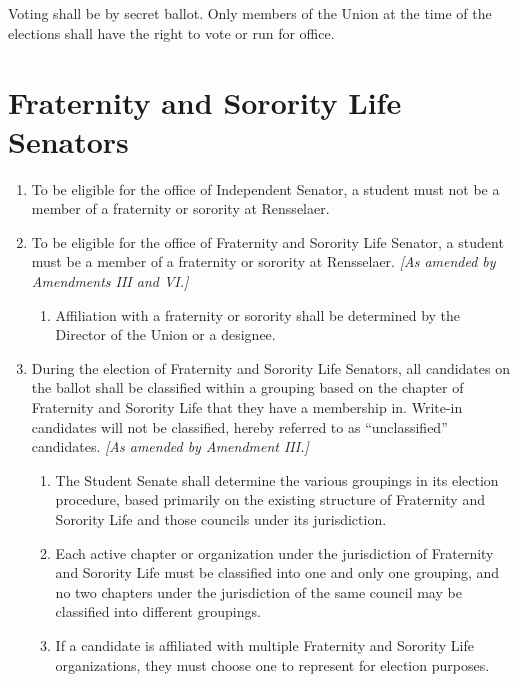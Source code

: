 \documentclass{uniondoc}
\begin{document}
\section{}

Voting shall be by secret ballot. Only members of the Union at the time of the elections shall have the right to vote or run for office.

\section{Fraternity and Sorority Life Senators}

\begin{enumerate}
\item To be eligible for the office of Independent Senator, a student must not be a member of a fraternity or sorority at Rensselaer.
\item To be eligible for the office of Fraternity and Sorority Life Senator, a student must be a member of a fraternity or sorority at Rensselaer. \textit{[As amended by Amendments III and VI.]}
  \begin{enumerate}
  \item Affiliation with a fraternity or sorority shall be determined by the Director of the Union or a designee.
  \end{enumerate}
\item During the election of Fraternity and Sorority Life Senators, all candidates on the ballot shall be classified within a grouping based on the chapter of Fraternity and Sorority Life that they have a membership in. Write-in candidates will not be classified, hereby referred to as ``unclassified'' candidates. \textit{[As amended by Amendment III.]}
  \begin{enumerate}
  \item The Student Senate shall determine the various groupings in its election procedure, based primarily on the existing structure of Fraternity and Sorority Life and those councils under its jurisdiction.
  \item Each active chapter or organization under the jurisdiction of Fraternity and Sorority Life must be classified into one and only one grouping, and no two chapters under the jurisdiction of the same council may be classified into different groupings.
  \item If a candidate is affiliated with multiple Fraternity and Sorority Life organizations, they must choose one to represent for election purposes.
  \end{enumerate}

\end{enumerate}
\end{document}
